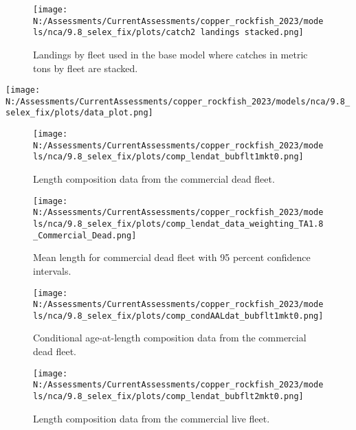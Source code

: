 \documentclass[11pt,
  english,
  letterpaper,
]{article}
\begin{document}
\pagebreak

\begin{figure}
\centering
\texttt{[image: N:/Assessments/CurrentAssessments/copper\_rockfish\_2023/models/nca/9.8\_selex\_fix/plots/catch2 landings stacked.png]}
\caption{Landings by fleet used in the base model where catches in metric tons by fleet are stacked.\label{fig:catch}}
\end{figure}

\pagebreak

\texttt{[image: N:/Assessments/CurrentAssessments/copper\_rockfish\_2023/models/nca/9.8\_selex\_fix/plots/data\_plot.png]} \pagebreak

\begin{figure}
\centering
\texttt{[image: N:/Assessments/CurrentAssessments/copper\_rockfish\_2023/models/nca/9.8\_selex\_fix/plots/comp\_lendat\_bubflt1mkt0.png]}
\caption{Length composition data from the commercial dead fleet.\label{fig:com-dead-len-data}}
\end{figure}

\pagebreak

\begin{figure}
\centering
\texttt{[image: N:/Assessments/CurrentAssessments/copper\_rockfish\_2023/models/nca/9.8\_selex\_fix/plots/comp\_lendat\_data\_weighting\_TA1.8\_Commercial\_Dead.png]}
\caption{Mean length for commercial dead fleet with 95 percent confidence intervals.\label{fig:mean-com-dead-len-data}}
\end{figure}

\pagebreak

\begin{figure}
\centering
\texttt{[image: N:/Assessments/CurrentAssessments/copper\_rockfish\_2023/models/nca/9.8\_selex\_fix/plots/comp\_condAALdat\_bubflt1mkt0.png]}
\caption{Conditional age-at-length composition data from the commercial dead fleet.\label{fig:com-dead-age-data}}
\end{figure}

\pagebreak

\begin{figure}
\centering
\texttt{[image: N:/Assessments/CurrentAssessments/copper\_rockfish\_2023/models/nca/9.8\_selex\_fix/plots/comp\_lendat\_bubflt2mkt0.png]}
\caption{Length composition data from the commercial live fleet.\label{fig:com-live-len-data}}
\end{figure}
\end{document}
